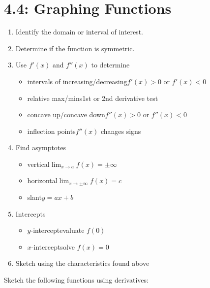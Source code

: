 \documentclass[mathNotesPreamble]{subfiles}
\begin{document}
\section{4.4: Graphing Functions}
\begin{thmBox*}[Graphing Guidelines for $y=f(x)$]
  \parbox{0.9\linewidth}{
  \begin{enumerate}
    \item Identify the domain or interval of interest.
    \item Determine if the function is symmetric.
    \item Use $f'(x)$ and $f''(x)$ to determine 
      \begin{itemize}
        \item intervals of increasing/decreasing\dotfill $f'(x)>0$ or $f'(x)<0$
        \item relative max/mins\dotfill 1st or 2nd derivative test
        \item concave up/concave down\dotfill $f''(x)>0$ or $f''(x)<0$
        \item inflection points\dotfill $f''(x)$ changes signs
      \end{itemize}
    \item Find asymptotes
      \begin{itemize}
        \item vertical\dotfill $\lim_{x\to a} f(x)=\pm\infty$
        \item horizontal\dotfill $\lim_{x\to \pm\infty} f(x)=c$
        \item slant\dotfill $y=ax+b$
      \end{itemize}
    \item Intercepts
      \begin{itemize}
        \item $y$-intercept\dotfill evaluate $f(0)$
        \item $x$-intercept\dotfill solve $f(x)=0$
      \end{itemize}
    \item Sketch using the characteristics found above
  \end{enumerate}}
\end{thmBox*}
\pagebreak
\begin{ex*}
  Sketch the following functions using derivatives:
\end{ex*}
\end{document}
